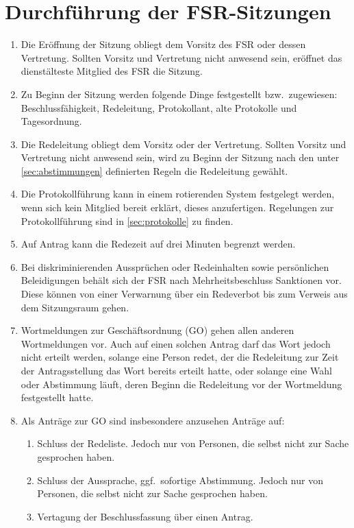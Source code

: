 \section{Durchführung der FSR-Sitzungen}
\begin{enumerate}
	\item Die Eröffnung der Sitzung obliegt dem Vorsitz des FSR oder dessen Vertretung.
	Sollten Vorsitz und Vertretung nicht anwesend sein, eröffnet das dienstälteste Mitglied des FSR die Sitzung.
	\item Zu Beginn der Sitzung werden folgende Dinge festgestellt bzw.\ zugewiesen: Beschlussfähigkeit, Redeleitung, Protokollant, alte Protokolle und Tagesordnung.
	\item Die Redeleitung obliegt dem Vorsitz oder der Vertretung.
	Sollten Vorsitz und Vertretung nicht anwesend sein, wird zu Beginn der Sitzung nach den unter \ref{sec:abstimmungen} definierten Regeln die Redeleitung gewählt.
	\item Die Protokollführung kann in einem rotierenden System festgelegt werden, wenn sich kein Mitglied bereit erklärt, dieses anzufertigen.
	Regelungen zur Protokollführung sind in \ref{sec:protokolle} zu finden.
	\item Auf Antrag kann die Redezeit auf drei Minuten begrenzt werden.
	\item Bei diskriminierenden Aussprüchen oder Redeinhalten sowie persönlichen Beleidigungen behält sich der FSR nach Mehrheitsbeschluss Sanktionen vor.
	Diese können von einer Verwarnung über ein Redeverbot bis zum Verweis aus dem Sitzungsraum gehen.
	\item Wortmeldungen zur Geschäftsordnung (GO) gehen allen anderen Wortmeldungen vor.
	Auch auf einen solchen Antrag darf das Wort jedoch nicht erteilt werden, solange eine Person redet, der die Redeleitung zur Zeit der Antragsstellung das Wort bereits erteilt hatte, oder solange eine Wahl oder Abstimmung läuft, deren Beginn die Redeleitung vor der Wortmeldung festgestellt hatte.
	\item Als Anträge zur GO sind insbesondere anzusehen Anträge auf:
	\begin{enumerate}
		\item Schluss der Redeliste.
		Jedoch nur von Personen, die selbst nicht zur Sache gesprochen haben.
		\item Schluss der Aussprache, ggf.\ sofortige Abstimmung.
		Jedoch nur von Personen, die selbst nicht zur Sache gesprochen haben.
		\item Vertagung der Beschlussfassung über einen Antrag.

\end{enumerate}
\end{enumerate}
